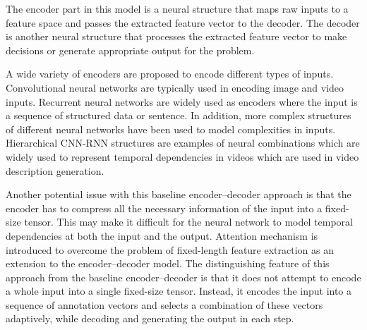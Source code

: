 \documentclass[preprint, 12pt]{elsarticle}
\begin{document}
	The encoder part in this model is a neural structure that maps raw inputs to a feature space and passes the extracted feature vector to the decoder. The decoder is another neural structure that processes the extracted feature vector to make decisions or generate appropriate output for the problem.
	
	A wide variety of encoders are proposed to encode different types of inputs. Convolutional neural networks are typically used in encoding image and video inputs. Recurrent neural networks are widely used as encoders where the input is a sequence of structured data or sentence. In addition, more complex structures of different neural networks have been used to model complexities in inputs. Hierarchical CNN-RNN structures are examples of neural combinations which are widely used to represent temporal dependencies in videos which are used in video description generation.
	
	
	Another potential issue with this baseline encoder–decoder approach is that the encoder has to compress all the necessary information of the input into a fixed-size tensor. This may make it difficult for the neural network to model temporal dependencies at both the input and the output. Attention mechanism is introduced to overcome the problem of fixed-length feature extraction as an extension to the encoder–decoder model. The distinguishing feature of this approach from the baseline encoder–decoder is that it does not attempt to encode a whole input into a single fixed-size tensor. Instead, it encodes the input into a sequence of annotation vectors and selects a combination of these vectors adaptively, while decoding and generating the output in each step.
	
\end{document}
